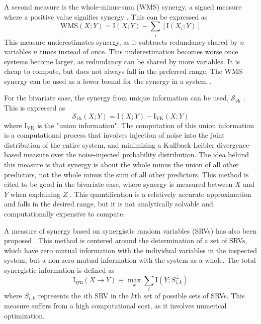 \documentclass[../main.tex]{subfiles}
\begin{document}
A second measure is the whole-minus-sum (WMS) synergy, a signed measure where a positive value
signifies synergy \cite{gawne1993independent, griffith2014quantifying}.
This can be expressed as
%
\begin{equation}
\mathrm{WMS} \left( X;Y \right) = \mathrm{I} \left( X;Y \right) - \sum_i [\mathrm{I} \left( X_i;Y \right)]
\label{WMS}
\end{equation}
%
This measure underestimates synergy, as it subtracts redundancy shared by $n$ variables $n$ times instead of once.
This underestimation becomes worse once systems become larger, as redundancy can be shared by more variables.
It is cheap to compute, but does not always fall in the preferred range.
The WMS-synergy can be used as a lower bound for the synergy in a system \cite{griffith2014quantifying, olbrich2015information}.

For the bivariate case, the synergy from unique information can be used, $\mathcal{S}_\mathrm{vk}$ \cite{bertschinger2014quantifying, griffith2014quantifying, olbrich2015information}.
This is expressed as
\begin{equation}
\mathcal{S}_\mathrm{vk} \left( X;Y \right) = \mathrm{I}\left( X;Y \right) - \mathrm{I}_\mathrm{VK} \left( X;Y \right)
\end{equation}
%
where $\mathrm{I}_\mathrm{VK}$ is the "union information".
The computation of this union information is a computational process that involves injection of noise into the joint distribution of the entire system, and minimizing a Kullback-Leibler divergence-based measure over the noise-injected probability distribution.
The idea behind this measure is that synergy is about the whole minus the union of all other predictors, not the whole minus the sum of all other predictors.
This method is cited to be good in the bivariate case, where synergy is measured between $X$ and $Y$ when explaining $Z$ \cite{olbrich2015information}.
This quantification is a relatively accurate approximation and falls in the desired range, but it is not analytically solvable and computationally expensive to compute.

A measure of synergy based on synergistic random variables (SRVs) has also been proposed \cite{quax2017quantifying}.
This method is centered around the determination of a set of SRVs, which have zero mutual information with the individual variables in the inspected system, but a non-zero mutual information with the system as a whole.
The total synergistic information is defined as
\begin{equation}
\label{SRV}
\mathrm{I}_\mathrm{syn}\left( X \rightarrow Y\right) \equiv \max_k \sum_i \mathrm{I}\left( Y ; S_{i,k}^\perp \right)
\end{equation}
where $S_{i,k}$ represents the $i$th SRV in the $k$th set of possible sets of SRVs.
This measure suffers from a high computational cost, as it involves numerical optimization.
\end{document}
